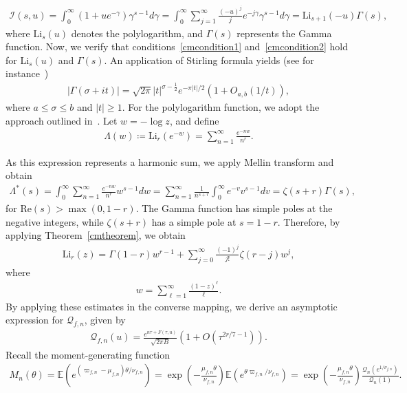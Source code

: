 \documentclass[12pt, oneside,reqno]{amsart}
\numberwithin{equation}{section}
\begin{document}
\begin{align*}
\mathcal{I}(s,u)
=\int_{0}^{\infty} (1+ue^{-\gamma})\gamma^{s-1}d\gamma
=\int_{0}^{\infty}\sum_{j=1}^{\infty} \frac{(-u)^{j}}{j}e^{-j\gamma}\gamma^{s-1}d\gamma
=\mathrm{Li}_{s+1}(-u)\Gamma(s),
\end{align*}
where $\mathrm{Li}_{s}(u)$ denotes the polylogarithm, and $\Gamma(s)$ represents the Gamma function. Now, we verify that conditions~\eqref{cmcondition1} and~\eqref{cmcondition2} hold for $\mathrm{Li}_{s}(u)$ and $\Gamma(s)$. An application of Stirling formula yields (see for instance~\cite[\S5 (A.4)]{iwanieckowlaski})
\begin{align*}
|\Gamma(\sigma+it)|=\sqrt{2\pi}|t|^{\sigma-\tfrac{1}{2}}e^{-\pi|t|/2}(1+O_{a,b}(1/t)),   
\end{align*}
where $a\leq\sigma\leq b$ and $|t|\geq 1$. For the polylogarithm function, we adopt the approach outlined in~\cite{lipniketal}. Let $w=-\log z$, and define
\begin{align*}
\Lambda(w)\coloneqq\mathrm{Li}_{r}(e^{-w})
=\sum_{n=1}^{\infty}\frac{e^{-nw}}{n^{r}}.
\end{align*}

\noindent
As this expression represents a harmonic sum, we apply Mellin transform and obtain
\begin{align*}
\Lambda^{*}(s) 
=\int_{0}^{\infty}\sum_{n=1}^{\infty}\frac{e^{-nw}}{n^r}w^{s-1}dw
=\sum_{n=1}^{\infty}\frac{1}{n^{s+r}}\int_{0}^{\infty}e^{-v}v^{s-1}dv
=\zeta(s+r)\Gamma(s),
\end{align*}
for $\mathrm{Re}(s)>\max(0,1-r)$. The Gamma function has simple poles at the negative integers, while $\zeta(s+r)$ has a simple pole at $s=1-r$. Therefore, by applying Theorem~\ref{cmtheorem}, we obtain
\begin{align*}
\mathrm{Li}_{r}(z)
=\Gamma(1-r)w^{r-1}+\sum_{j=0}^{\infty}\frac{(-1)^{j}}{j!}\zeta(r-j)w^{j},
\end{align*}
where 
\begin{align*}
w=\sum_{\ell=1}^{\infty}\frac{(1-z)^{\ell}}{\ell}.    
\end{align*}
\noindent
By applying these estimates in the converse mapping, we derive an asymptotic expression for $\mathcal{Q}_{f,n}$, given by
\begin{align}\label{saddlepointtheorem}
\mathcal{Q}_{f,n}(u)
=\frac{e^{n\tau+F(\tau,u)}}{\sqrt{2\pi B}}(1+O(\tau^{2r/7-1})).
\end{align}
\noindent
Recall the moment-generating function
\begin{align*}
M_n(\theta)=\mathbb{E}(e^{(\varpi_{f,n}-\mu_{f,n})\theta/\nu_{f,n}})
=\exp\left(-\frac{\mu_{f,n}\theta}{\nu_{f,n}}\right)\mathbb{E}(e^{\theta\varpi_{f,n}/\nu_{f,n}})
=\exp\left(-\frac{\mu_{f,n}\theta}{\nu_{f,n}}\right)\frac{\mathcal{Q}_{n}(e^{1/\nu_{f,n}})}{\mathcal{Q}_{n}(1)}.
\end{align*}
\end{document}
